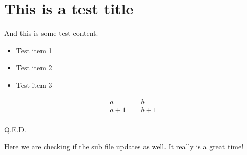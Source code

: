 \section{This is a test title}

And this is some test content.
\begin{itemize}
    \item Test item 1
    \item Test item 2
    \item Test item 3
\end{itemize}

\begin{align}
    a &= b \\
    a + 1 &= b + 1 \\
\end{align}

Q.E.D.

Here we are checking if the sub file updates as well.
It really is a great time!
